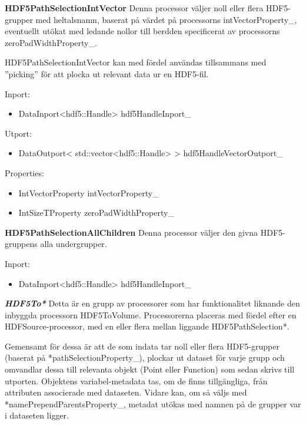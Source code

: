 \textbf{HDF5PathSelectionIntVector} \newline
Denna processor väljer noll eller flera HDF5-grupper med heltalsnamn, baserat på värdet på processorns intVectorProperty\_, eventuellt utökat med ledande nollor till berdden specificerat av processorns zeroPadWidthProperty\_. 

HDF5PathSelectionIntVector kan med fördel användas tillsammans med ''picking'' för att plocka ut relevant data ur en HDF5-fil.

Inport:
\begin{itemize}
\item DataInport<hdf5::Handle> hdf5HandleInport\_
\end{itemize}

Utport:
\begin{itemize}
\item DataOutport< std::vector<hdf5::Handle> > hdf5HandleVectorOutport\_
\end{itemize}

Properties:
\begin{itemize}
    \setlength\itemsep{0em}
    \item IntVectorProperty intVectorProperty\_
    \item IntSizeTProperty zeroPadWidthProperty\_
\end{itemize}

\textbf{HDF5PathSelectionAllChildren}\newline
Denna processor väljer den givna HDF5-gruppens alla undergrupper.

Inport:
\begin{itemize}
\item DataInport<hdf5::Handle> hdf5HandleInport\_
\end{itemize}

\textbf{\textit{HDF5To*}}\newline
Detta är en grupp av processorer som har funktionalitet liknande den inbyggda processorn HDF5ToVolume. Processorerna placeras med fördel efter en HDFSource-processor, med en eller flera mellan liggande HDF5PathSelection*.

Gemensamt för dessa är att de som indata tar noll eller flera HDF5-grupper (baserat på *pathSelectionProperty\_), plockar ut dataset för varje grupp och omvandlar dessa till relevanta objekt (Point eller Function) som sedan skrivs till utporten. Objektens variabel-metadata tas, om de finns tillgängliga, från attributen associerade med dataseten. Vidare kan, om så väljs med *namePrependParentsProperty\_, metadat utökas med namnen på de grupper var i dataseten ligger.

